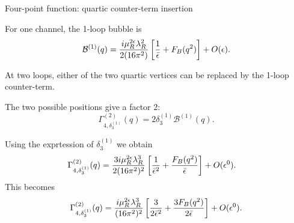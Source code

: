 \documentclass[aspectratio=169,10pt]{beamer}
\begin{document}
\begin{frame}{Four-point function: quartic counter-term insertion}

For one channel, the 1-loop bubble is
\begin{equation}
\mathcal B^{(1)}(q)
=
\frac{i\mu_R^{2\epsilon}\lambda_R^2}
{2(16\pi^2)}
\left[
\frac1{\bar\epsilon}
+
F_B(q^2)
\right]
+
O(\epsilon).
\end{equation}

At two loops, either of the two quartic vertices can be replaced
by the 1-loop counter-term.

The two possible positions give a factor $2$:
\begin{equation}
\Gamma_{4,\delta_3^{(1)}}^{(2)}(q)
=
2\delta_3^{(1)}
\mathcal B^{(1)}(q).
\end{equation}

Using the exprtession of $\delta_3^{(1)}$
we obtain
\begin{align}
\Gamma_{4,\delta_3^{(1)}}^{(2)}(q)
&=
\frac{3i\mu_R^{2\epsilon}\lambda_R^3}
{2(16\pi^2)^2}
\left[
\frac1{\bar\epsilon^2}
+
\frac{F_B(q^2)}{\bar\epsilon}
\right]
+
O(\epsilon^0).
\end{align}
This becomes
\begin{equation}
\Gamma_{4,\delta_3^{(1)}}^{(2)}(q)
=
\frac{i\mu_R^{2\epsilon}\lambda_R^3}
{(16\pi^2)^2}
\left[
\frac3{2\bar\epsilon^2}
+
\frac{3F_B(q^2)}
{2\bar\epsilon}
\right]
+
O(\epsilon^0).
\end{equation}


\end{frame}
\end{document}

